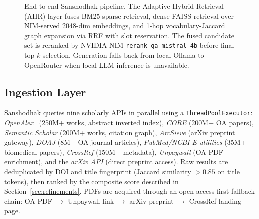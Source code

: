 \documentclass[journal]{IEEEtran}
\begin{document}
\begin{figure}[!t]
{
}
\caption{End-to-end Sanshodhak pipeline. The Adaptive Hybrid Retrieval
(AHR) layer fuses BM25 sparse retrieval, dense FAISS retrieval over
NIM-served 2048-dim embeddings, and 1-hop vocabulary-Jaccard graph
expansion via RRF with slot reservation. The fused candidate set is
reranked by NVIDIA NIM \texttt{rerank-qa-mistral-4b} before final
top-$k$ selection. Generation falls back from local Ollama to
OpenRouter when local LLM inference is unavailable.}
\label{fig:pipeline}
\end{figure}

\subsection{Ingestion Layer}
Sanshodhak queries nine scholarly APIs in parallel using a
\texttt{ThreadPoolExecutor}: \emph{OpenAlex}~\cite{priem2022openalex}
(250M+ works, abstract inverted index), \emph{CORE} (200M+ OA papers),
\emph{Semantic Scholar} (200M+ works, citation graph), \emph{ArcSieve}
(arXiv preprint gateway), \emph{DOAJ} (8M+ OA journal articles),
\emph{PubMed/NCBI E-utilities} (35M+ biomedical papers),
\emph{CrossRef} (150M+ metadata), \emph{Unpaywall} (OA PDF
enrichment), and the \emph{arXiv API} (direct preprint access). Raw
results are deduplicated by DOI and title fingerprint (Jaccard
similarity $>0.85$ on title tokens), then ranked by the composite
score described in Section~\ref{sec:refinements}. PDFs are acquired
through an open-access-first fallback chain: OA PDF $\rightarrow$
Unpaywall link $\rightarrow$ arXiv preprint $\rightarrow$ CrossRef
landing page.
\end{document}
